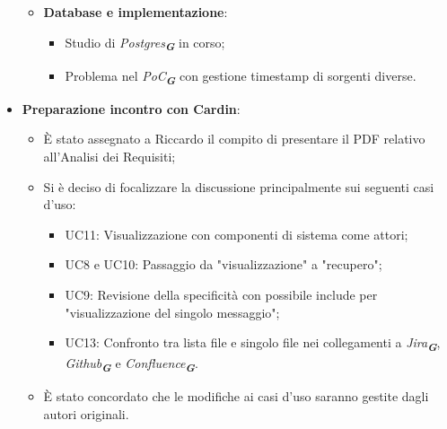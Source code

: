 \begin{itemize}
\begin{itemize}
        \item \textbf{Database e implementazione}:  
        \begin{itemize}
            \item Studio di \emph{Postgres}\textsubscript{\textit{\textbf{G}}} in corso;
            \item Problema nel \emph{PoC}\textsubscript{\textit{\textbf{G}}} con gestione timestamp di sorgenti diverse.  
        \end{itemize}
    \end{itemize}

    \item \textbf{Preparazione incontro con Cardin}:  
    \begin{itemize}
        \item È stato assegnato a Riccardo il compito di presentare il PDF relativo all’Analisi dei Requisiti;
        \item Si è deciso di focalizzare la discussione principalmente sui seguenti casi d’uso:
        \begin{itemize}
            \item UC11: Visualizzazione con componenti di sistema come attori;
            \item UC8 e UC10: Passaggio da "visualizzazione" a "recupero";
            \item UC9: Revisione della specificità con possibile include per "visualizzazione del singolo messaggio";
            \item UC13: Confronto tra lista file e singolo file nei collegamenti a \emph{Jira}\textsubscript{\textit{\textbf{G}}}, \emph{Github}\textsubscript{\textit{\textbf{G}}} e \emph{Confluence}\textsubscript{\textit{\textbf{G}}}.  
        \end{itemize}
        \item È stato concordato che le modifiche ai casi d’uso saranno gestite dagli autori originali.  
    \end{itemize}


\end{itemize}

